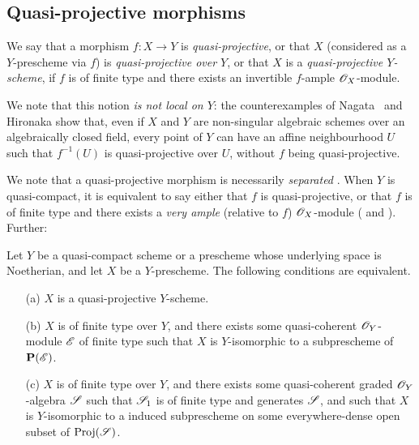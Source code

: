 \subsection{Quasi-projective morphisms}
\label{subsection:II.5.3}

\begin{definition}[5.3.1]
\label{II.5.3.1}
We say that a morphism $f:X\to Y$ is \emph{quasi-projective}, or that $X$ (considered as a $Y$-prescheme via $f$) is \emph{quasi-projective over $Y$}, or that $X$ is a \emph{quasi-projective $Y$-scheme}, if $f$ is of finite type and there exists an invertible $f$-ample $\mathscr{O}_X$-module.
\end{definition}

We note that this notion \emph{is not local on $Y$}:
the counterexamples of Nagata~\cite{II-26} and Hironaka show that, even if $X$ and $Y$ are non-singular algebraic schemes over an algebraically closed field, every point of $Y$ can have an affine neighbourhood $U$ such that $f^{-1}(U)$ is quasi-projective over $U$, without $f$ being quasi-projective.

We note that a quasi-projective morphism is necessarily \emph{separated} .
When $Y$ is quasi-compact, it is equivalent to say either that $f$ is quasi-projective, or that $f$ is of finite type and there exists a \emph{very ample} (relative to $f$) $\mathscr{O}_X$-module ( and ).
Further:

\begin{proposition}[5.3.2]
\label{II.5.3.2}
Let $Y$ be a quasi-compact scheme or a prescheme whose underlying space is Noetherian, and let $X$ be a $Y$-prescheme.
The following conditions are equivalent.
\begin{enumerate}
  \item[{\rm(a)}] $X$ is a quasi-projective $Y$-scheme.
  \item[{\rm(b)}] $X$ is of finite type over $Y$, and there exists some quasi-coherent $\mathscr{O}_Y$-module $\mathscr{E}$ of finite type such that $X$ is $Y$-isomorphic to a subprescheme of $\mathbf{P}(\mathscr{E})$.
  \item[{\rm(c)}] $X$ is of finite type over $Y$, and there exists some quasi-coherent graded $\mathscr{O}_Y$-algebra $\mathscr{S}$ such that $\mathscr{S}_1$ is of finite type and generates $\mathscr{S}$, and such that $X$ is $Y$-isomorphic to a induced subprescheme on some everywhere-dense open subset of $\operatorname{Proj}(\mathscr{S})$.
\end{enumerate}
\end{proposition}

